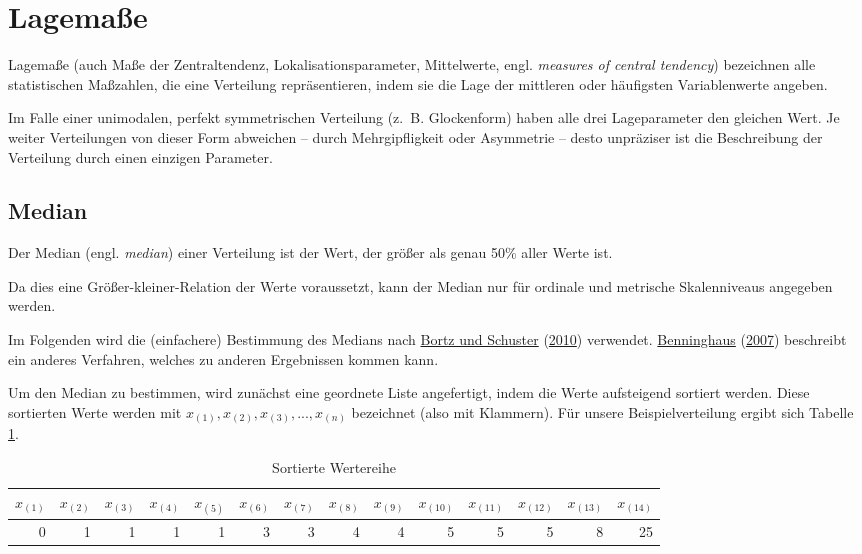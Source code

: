 \documentclass[
  11pt,
  ngerman,
  a4paper,
]{report}
\begin{document}
\hypertarget{lagemauxdfe}{%
\section{Lagemaße}\label{lagemauxdfe}}

Lagemaße (auch Maße der Zentraltendenz, Lokalisationsparameter, Mittelwerte, engl. \emph{measures of central tendency}) bezeichnen alle statistischen Maßzahlen, die eine Verteilung repräsentieren, indem sie die Lage der mittleren oder häufigsten Variablenwerte angeben.

Im Falle einer unimodalen, perfekt symmetrischen Verteilung (z.~B. Glockenform) haben alle drei Lageparameter den gleichen Wert. Je weiter Verteilungen von dieser Form abweichen -- durch Mehrgipfligkeit oder Asymmetrie -- desto unpräziser ist die Beschreibung der Verteilung durch einen einzigen Parameter.

\hypertarget{median}{%
\subsection{Median}\label{median}}

Der Median (engl. \emph{median}) einer Verteilung ist der Wert, der größer als genau 50\% aller Werte ist.

Da dies eine Größer-kleiner-Relation der Werte voraussetzt, kann der Median nur für ordinale und metrische Skalenniveaus angegeben werden.

Im Folgenden wird die (einfachere) Bestimmung des Medians nach \protect\hyperlink{ref-bortz}{Bortz und Schuster} (\protect\hyperlink{ref-bortz}{2010}) verwendet. \protect\hyperlink{ref-benninghaus}{Benninghaus} (\protect\hyperlink{ref-benninghaus}{2007}) beschreibt ein anderes Verfahren, welches zu anderen Ergebnissen kommen kann.

Um den Median zu bestimmen, wird zunächst eine geordnete Liste angefertigt, indem die Werte aufsteigend sortiert werden. Diese sortierten Werte werden mit \(x_{(1)}, x_{(2)}, x_{(3)}, ..., x_{(n)}\) bezeichnet (also mit Klammern). Für unsere Beispielverteilung ergibt sich Tabelle \ref{tab:sort}.

\begin{table}

\caption{\label{tab:sort}Sortierte Wertereihe}
\centering
\begin{tabular}[t]{rrrrrrrrrrrrrr}
\toprule
$x_{(1)}$ & $x_{(2)}$ & $x_{(3)}$ & $x_{(4)}$ & $x_{(5)}$ & $x_{(6)}$ & $x_{(7)}$ & $x_{(8)}$ & $x_{(9)}$ & $x_{(10)}$ & $x_{(11)}$ & $x_{(12)}$ & $x_{(13)}$ & $x_{(14)}$\\
\midrule
0 & 1 & 1 & 1 & 1 & 3 & 3 & 4 & 4 & 5 & 5 & 5 & 8 & 25\\
\bottomrule
\end{tabular}
\end{table}
\end{document}
